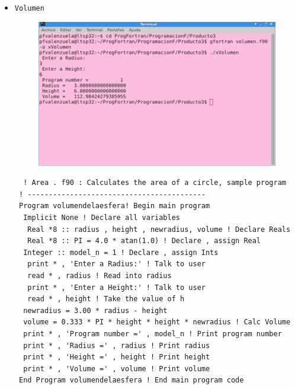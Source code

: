 \documentclass[12pt]{article}
\begin{document}
\begin{itemize}
  \item {\tt Volumen}
  \begin{figure}[h]
\centering
\includegraphics[scale=0.5]{volumen.png}
\end{figure}
  \begin{verbatim}
  ! Area . f90 : Calculates the area of a circle, sample program
 ! ------------------------------------------
 Program volumendelaesfera! Begin main program
  Implicit None ! Declare all variables
   Real *8 :: radius , height , newradius, volume ! Declare Reals
   Real *8 :: PI = 4.0 * atan(1.0) ! Declare , assign Real
  Integer :: model_n = 1 ! Declare , assign Ints
   print * , 'Enter a Radius:' ! Talk to user
   read * , radius ! Read into radius
   print * , 'Enter a Height:' ! Talk to user
   read * , height ! Take the value of h
  newradius = 3.00 * radius - height 
  volume = 0.333 * PI * height * height * newradius ! Calc Volume
  print * , 'Program number =' , model_n ! Print program number
  print * , 'Radius =' , radius ! Print radius
  print * , 'Height =' , height ! Print height
  print * , 'Volume =' , volume ! Print volume
 End Program volumendelaesfera ! End main program code
  
  \end{verbatim}
 
 
\end{itemize}
\end{document}
